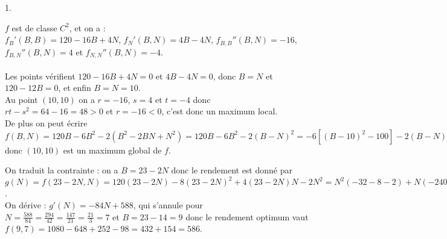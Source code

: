 \documentclass[11pt]{article}%
\begin{document}
\begin{exercice}
 \begin{noliste}{1.}
 \setlength{\itemsep}{4mm}
 \item $f$ est de classe $C^{2}$, et on a : \\
 $f_{B}'(B,B) = 120 - 16 B + 4N$, $f_{N}'(B,N) = 4 B - 4 N$,
$f_{B,B}''(B,N) = -16$, $f_{B,N}''(B,N) = 4$ et $f_{N,N}'' (B,N) = -4$.
\\
\\
 Les points vérifient $120 - 16 B + 4 N = 0$ et $4B - 4 N = 0$, donc $B
= N$ et $120-12B = 0$, et enfin $B = N = 10$. \\
 Au point $(10,10)$ on a $r = -16$, $s = 4$ et $t = -4$ donc $rt -
s^{2} = 64 - 16 = 48 > 0$ et $r = -16 < 0$, c'est donc un maximum
local. \\
 De plus on peut écrire $f(B,N) = 120 B - 6 B^{2} -2 ( B^{2} - 2 B N +
N^{2}) = 120 B - 6 B^{2} - 2 ( B- N)^{2} = -6 [ (B-10)^{2} -100]- 2
(B-N)^{2} = -6 (B-10)^{2} - 2 (B-N)^{2} + 600 = -6 (B-10)^{2} - 2
(B-N)^{2} + f (10,10)$ donc $(10,10)$ est un maximum global de $f$. \\

 \item On traduit la contrainte : on a $B = 23 - 2N$ donc le rendement
est donné par $g(N) = f( 23 - 2N, N) = 120 (23 - 2N) - 8 (23 - 2 N)^{2}
+ 4 (23 - 2N) N - 2 N^{2} = N^{2} ( -32 -8 - 2) + N ( - 240 + 736 + 92)
+ (120 - 184) \times 23 = -42 N^{2} + 588 N - 64 \times 23$. \\
 On dérive : $g'(N) = - 84 N + 588$, qui s'annule pour $N =
\frac{588}{84} = \frac{294}{42} = \frac{147}{21} = \frac{21}{3} = 7$ et
$B = 23 - 14 = 9$ donc le rendement optimum vaut $f( 9, 7) = 1080 - 648
+ 252 - 98 = 432 + 154 = 586$.
 \end{noliste}
 \end{exercice}

 \newpage
\end{document}
